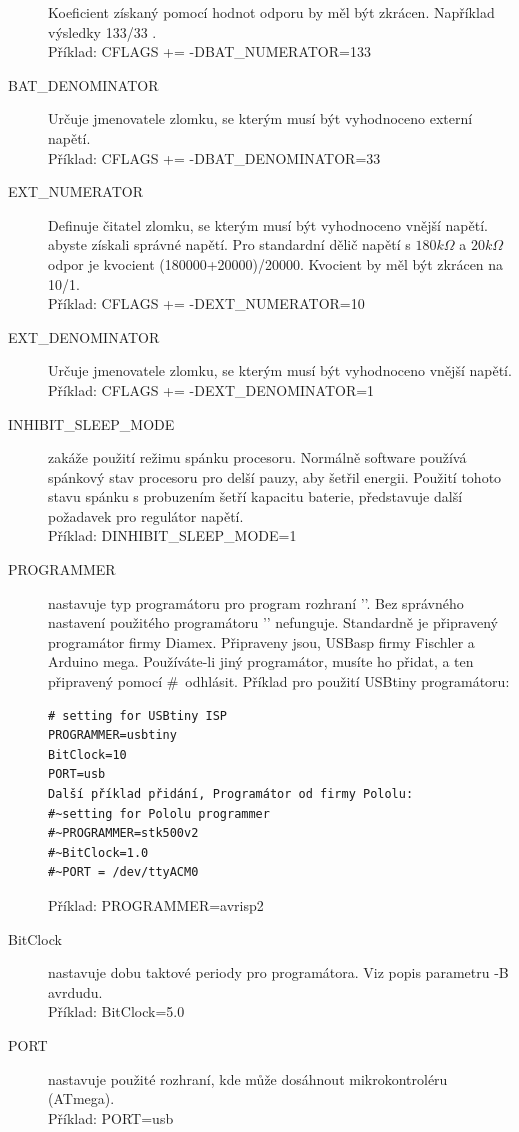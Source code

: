 \begin{description}
Koeficient získaný pomocí hodnot odporu by měl být zkrácen. Například výsledky 133/33 .\\
Příklad: CFLAGS += -DBAT\_NUMERATOR=133
 \item[BAT\_DENOMINATOR] Určuje jmenovatele zlomku, se kterým musí být vyhodnoceno externí napětí.\\
Příklad: CFLAGS += -DBAT\_DENOMINATOR=33
 \item[EXT\_NUMERATOR] Definuje čitatel zlomku, se kterým musí být vyhodnoceno vnější napětí.
abyste získali správné napětí. Pro standardní dělič napětí s \(180 k\Omega\) a \(20 k\Omega\) odpor
je kvocient (180000+20000)/20000.
Kvocient by měl být zkrácen na 10/1.\\
Příklad: CFLAGS += -DEXT\_NUMERATOR=10
 \item[EXT\_DENOMINATOR] Určuje jmenovatele zlomku, se kterým musí být vyhodnoceno vnější napětí.\\
Příklad: CFLAGS += -DEXT\_DENOMINATOR=1
  \item[INHIBIT\_SLEEP\_MODE] zakáže použití režimu spánku procesoru.
Normálně software používá spánkový stav procesoru pro delší pauzy, aby šetřil energii.
Použití tohoto stavu spánku s probuzením šetří kapacitu baterie,
představuje další požadavek pro regulátor napětí.\\
Příklad: DINHIBIT\_SLEEP\_MODE=1
  \item[PROGRAMMER] \label{PROGRAMMER} nastavuje typ programátoru pro program rozhraní ''.
Bez správného nastavení použitého programátoru '' nefunguje.
Standardně je připravený programátor firmy Diamex.
Připraveny jsou, USBasp firmy Fischler a Arduino mega.
Používáte-li jiný programátor, musíte ho přidat, a ten připravený pomocí \#~odhlásit.
Příklad pro použití USBtiny programátoru:
\vspace{-1\baselineskip}
\begin{verbatim}
# setting for USBtiny ISP
PROGRAMMER=usbtiny
BitClock=10
PORT=usb
Další příklad přidání, Programátor od firmy Pololu:
#~setting for Pololu programmer
#~PROGRAMMER=stk500v2
#~BitClock=1.0
#~PORT = /dev/ttyACM0
\end{verbatim}
Příklad: PROGRAMMER=avrisp2
  \item[BitClock] nastavuje dobu taktové periody pro programátora. Viz popis parametru -B avrdudu.\\
Příklad: BitClock=5.0
  \item[PORT] nastavuje použité rozhraní, kde může  dosáhnout mikrokontroléru (ATmega).\\
Příklad: PORT=usb
\end{description}

